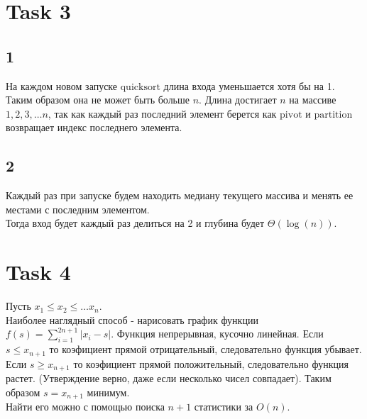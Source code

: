 \documentclass[12pt]{exam}
\begin{document}
\section*{Task 3}
\subsection*{1}
На каждом новом запуске $\mathrm{quicksort}$ длина входа уменьшается хотя бы на 1. 
Таким образом она не может быть больше $n$. 
Длина достигает $n$ на массиве $1, 2, 3, \ldots n$, так как каждый раз последний элемент берется как $\mathrm{pivot}$ 
и $\mathrm{partition}$ возвращает индекс последнего элемента.

\subsection*{2}
Каждый раз при запуске будем находить медиану текущего массива и менять ее местами с последним элементом.\\
Тогда вход будет каждый раз делиться на 2 и глубина будет $\Theta(\log(n))$.

\section*{Task 4}
Пусть $x_1 \leq x_2 \leq \ldots x_n$.\\
Наиболее наглядный способ - нарисовать график функции $f(s) = \sum_{i = 1}^{2n + 1} | x_i - s |$.
Функция непрерывная, кусочно линейная. 
Если $s \leq x_{n+1}$ то коэфициент прямой отрицательный, следовательно функция убывает.
Если $s \geq x_{n+1}$ то коэфициент прямой положительный, следовательно функция растет.
(Утверждение верно, даже если несколько чисел совпадает).
Таким образом $s = x_{n+1}$ минимум. \\
Найти его можно с помощью поиска $n+1$ статистики за $O(n)$.
\end{document}
